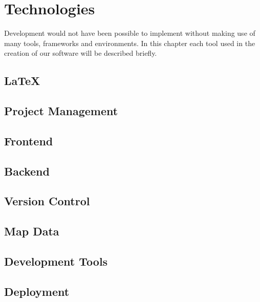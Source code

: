 \section{Technologies}

Development would not have been possible to implement without making use of many tools, frameworks and environments. In this chapter each tool used in the creation of our software will be described briefly.

\subsection{LaTeX}


\subsection{Project Management}


\subsection{Frontend}


\subsection{Backend}


\subsection{Version Control}


\subsection{Map Data}


\subsection{Development Tools}


\subsection{Deployment}
